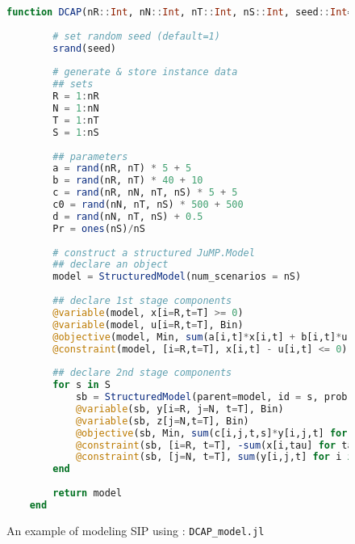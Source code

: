 \begin{figure}[]
	\centering
	\begin{lstlisting}[frame=single,language=julia]
	function DCAP(nR::Int, nN::Int, nT::Int, nS::Int, seed::Int=1)::JuMP.Model
		
		# set random seed (default=1)
		srand(seed)
		
		# generate & store instance data
		## sets
		R = 1:nR
		N = 1:nN
		T = 1:nT
		S = 1:nS
		
		## parameters
		a = rand(nR, nT) * 5 + 5
		b = rand(nR, nT) * 40 + 10
		c = rand(nR, nN, nT, nS) * 5 + 5
		c0 = rand(nN, nT, nS) * 500 + 500
		d = rand(nN, nT, nS) + 0.5
		Pr = ones(nS)/nS
		
		# construct a structured JuMP.Model
		## declare an object
		model = StructuredModel(num_scenarios = nS)
		
		## declare 1st stage components
		@variable(model, x[i=R,t=T] >= 0)
		@variable(model, u[i=R,t=T], Bin)
		@objective(model, Min, sum(a[i,t]*x[i,t] + b[i,t]*u[i,t] for i in R for t in T))
		@constraint(model, [i=R,t=T], x[i,t] - u[i,t] <= 0)
		
		## declare 2nd stage components
		for s in S
			sb = StructuredModel(parent=model, id = s, prob = Pr[s])
			@variable(sb, y[i=R, j=N, t=T], Bin)
        	@variable(sb, z[j=N,t=T], Bin)
			@objective(sb, Min, sum(c[i,j,t,s]*y[i,j,t] for i in R for j in N for t in T) + sum(c0[j,t,s]*z[j,t] for j in N for t in T))
			@constraint(sb, [i=R, t=T], -sum(x[i,tau] for tau in 1:t) + sum(d[j,t,s]*y[i,j,t] for j in N) <= 0)
			@constraint(sb, [j=N, t=T], sum(y[i,j,t] for i in R) + z[j,t] == 1)
		end
		
		return model
	end

	\end{lstlisting}
	\caption{An example of modeling SIP using \structjump: \texttt{DCAP\_model.jl}}\label{fig:DCAP_model.jl}
\end{figure}

